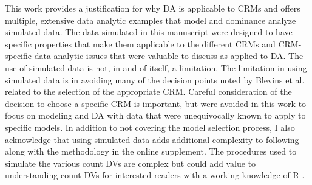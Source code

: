 \documentclass[ShortAfour,times,sageapa]{sagej}
\begin{document}
%	
%	
	
	This work provides a justification for why DA is applicable to CRMs and offers multiple, extensive data analytic examples that model and dominance analyze simulated data.
	The data simulated in this manuscript were designed to have specific properties that make them applicable to the different CRMs and CRM-specific data analytic issues that were valuable to discuss as applied to DA.
	The use of simulated data is not, in and of itself, a limitation.
	The limitation in using simulated data is in avoiding many of the decision points noted by Blevins et al. \citeyear{blevins2015count} related to the selection of the appropriate CRM.
	Careful consideration of the decision to choose a specific CRM is important, but were avoided in this work to focus on modeling and DA with data that were unequivocally known to apply to specific models.
	In addition to not covering the model selection process, I also acknowledge that using simulated data adds additional complexity to following along with the methodology in the online supplement.
	The procedures used to simulate the various count DVs are complex but could add value to understanding count DVs for interested readers with a working knowledge of R \cite{R}.
	
\end{document}
